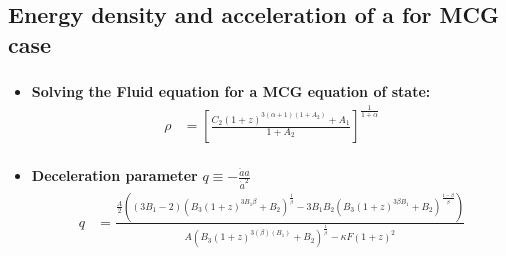 \documentclass[8pt,hideothersubsections]{beamer}
\newcommand{\brac}[1]{\left(#1\right)}
\newcommand{\bracc}[1]{\left[#1\right]}
\begin{document}
\subsection{Energy density and acceleration of a for MCG case}
\begin{frame}
\frametitle{\insertsubsectionhead}
\fontsize{8pt}{7.2}\selectfont
\begin{itemize}
\item \textbf{Solving the Fluid equation for a MCG equation of state:}
\begin{equation}\label{eq:FMCGZ}
\begin{split}
\rho  &= \bracc{\frac{C_{2}\brac{1+z}^{3\brac{\alpha+1}\brac{1+A_{2}}}+A_{1}}{1+A_{2}}}^{\frac{1}{1+\alpha}} \\
\end{split}
\end{equation}
\fontsize{8pt}{7.2}\selectfont
\item \textbf{Deceleration parameter} $q\equiv-\frac{\ddot{a}a}{\dot{a}^{2}}$
\fontsize{6pt}{7.2}\selectfont
\begin{equation}\label{eq:ChModDecelZ}
\begin{split}
q &= \frac{\frac{A}{2}\brac{\brac{3B_{1}-2}\brac{B_{3}\brac{1+z}^{3B_{1}\beta}+B_{2}}^{\frac{1}{\beta}}-3B_{1}B_{2}\brac{B_{3}\brac{1+z}^{3\beta B_{1}}+B_{2}}^{\frac{1-\beta}{\beta}}}}{A\brac{B_{3}\brac{1+z}^{3\brac{\beta}\brac{B_{1}}}+B_{2}}^{\frac{1}{\beta}} -\kappa F\brac{1+z}^{2}}
\end{split}
\end{equation}
\end{itemize}


\end{frame}
\end{document}
